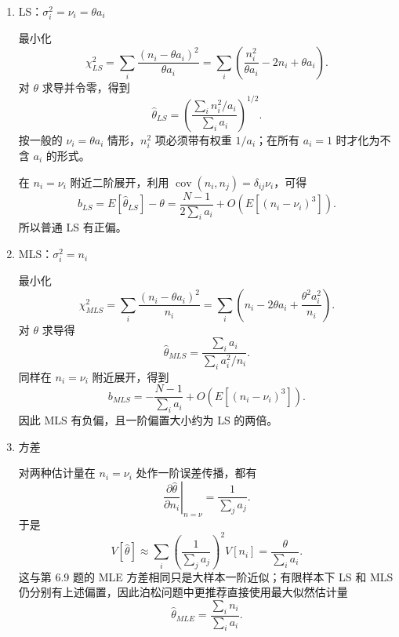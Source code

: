 \begin{question}
\begin{solution}
\begin{enumerate}
\item LS：\(\sigma_i^2=\nu_i=\theta a_i\)

最小化
\[
\chi^2_{LS}=\sum_i\frac{(n_i-\theta a_i)^2}{\theta a_i}
=\sum_i\left(\frac{n_i^2}{\theta a_i}-2n_i+\theta a_i\right).
\]
对 \(\theta\) 求导并令零，得到
\[
\hat\theta_{LS}
=\left(\frac{\sum_i n_i^2/a_i}{\sum_i a_i}\right)^{1/2}.
\]
按一般的 \(\nu_i=\theta a_i\) 情形，\(n_i^2\) 项必须带有权重 \(1/a_i\)；在所有 \(a_i=1\) 时才化为不含 \(a_i\) 的形式。

在 \(n_i=\nu_i\) 附近二阶展开，利用
\(\operatorname{cov}(n_i,n_j)=\delta_{ij}\nu_i\)，可得
\[
b_{LS}=E[\hat\theta_{LS}]-\theta
=\frac{N-1}{2\sum_i a_i}+O(E[(n_i-\nu_i)^3]).
\]
所以普通 LS 有正偏。

\item MLS：\(\sigma_i^2=n_i\)

最小化
\[
\chi^2_{MLS}=\sum_i\frac{(n_i-\theta a_i)^2}{n_i}
=\sum_i\left(n_i-2\theta a_i+\frac{\theta^2a_i^2}{n_i}\right).
\]
对 \(\theta\) 求导得
\[
\hat\theta_{MLS}
=\frac{\sum_i a_i}{\sum_i a_i^2/n_i}.
\]
同样在 \(n_i=\nu_i\) 附近展开，得到
\[
b_{MLS}
= -\frac{N-1}{\sum_i a_i}+O(E[(n_i-\nu_i)^3]).
\]
因此 MLS 有负偏，且一阶偏置大小约为 LS 的两倍。

\item 方差

对两种估计量在 \(n_i=\nu_i\) 处作一阶误差传播，都有
\[
\left.\frac{\partial\hat\theta}{\partial n_i}\right|_{n=\nu}
=\frac1{\sum_j a_j}.
\]
于是
\[
V[\hat\theta]
\approx\sum_i\left(\frac1{\sum_j a_j}\right)^2V[n_i]
=\frac{\theta}{\sum_i a_i}.
\]
这与第 6.9 题的 MLE 方差相同只是大样本一阶近似；有限样本下 LS 和 MLS 仍分别有上述偏置，因此泊松问题中更推荐直接使用最大似然估计量
\[
\hat\theta_{MLE}=\frac{\sum_i n_i}{\sum_i a_i}.
\]
\end{enumerate}
\end{solution}
\end{question}




